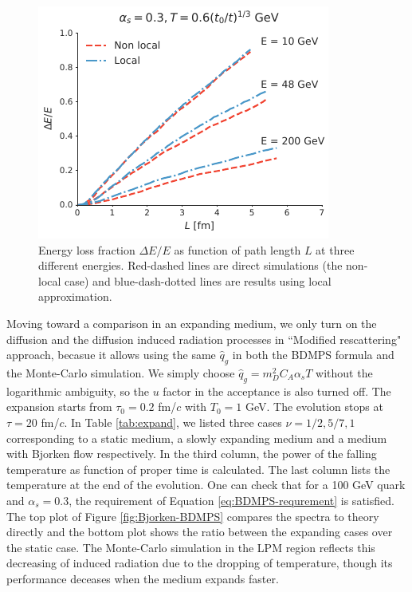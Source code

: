 \documentclass[aps, prc, reprint, amsmath, groupedaddress, nofootinbib]{revtex4-1}
\begin{document}
{\begin{figure}
\includegraphics[width=\columnwidth]{Bjorken.pdf}
\caption{Energy loss fraction $\Delta E /E$ as function of path length $L$ at three different energies. Red-dashed lines are direct simulations (the non-local case) and blue-dash-dotted lines are results using local approximation.}
\label{fig:Bjorken}
\end{figure}

Moving toward a comparison in an expanding medium, we only turn on the diffusion and the diffusion induced radiation  processes in ``Modified rescattering" approach, becasue it allows using the same $\hat{q}_g$ in both the BDMPS formula and the Monte-Carlo simulation.
We simply choose $\hat{q}_g = m_D^2 C_A\alpha_s T$ without the logarithmic ambiguity, so the $u$ factor in the acceptance is also turned off. 
The expansion starts from $\tau_0=0.2$ fm/$c$ with $T_0=1$ GeV. 
The evolution stops at $\tau = 20$ fm/$c$. 
In Table \ref{tab:expand}, we listed three cases $\nu = 1/2, 5/7, 1$ corresponding to a static medium, a slowly expanding medium and a medium with Bjorken flow respectively.
In the third column, the power of the falling temperature as function of proper time is calculated. The last column lists the temperature at the end of the evolution.
One can check that for a 100 GeV quark and $\alpha_s = 0.3$, the requirement of Equation \ref{eq:BDMPS-requrement} is satisfied.
The top plot of Figure \ref{fig:Bjorken-BDMPS} compares the spectra to theory directly and the bottom plot shows the ratio between the expanding cases over the static case. 
The Monte-Carlo simulation in the LPM region reflects this decreasing of induced radiation due to the dropping of temperature, though its performance deceases when the medium expands faster.

}
\end{document}
